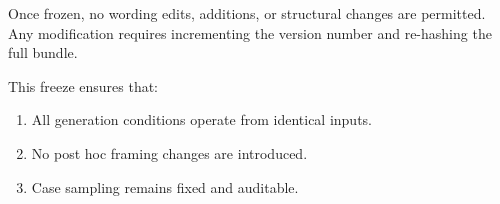 Once frozen, no wording edits, additions, or structural changes are permitted. Any modification requires incrementing the version number and re-hashing the full bundle.

This freeze ensures that:
\begin{enumerate}
    \item All generation conditions operate from identical inputs.
    \item No post hoc framing changes are introduced.
    \item Case sampling remains fixed and auditable.
\end{enumerate}